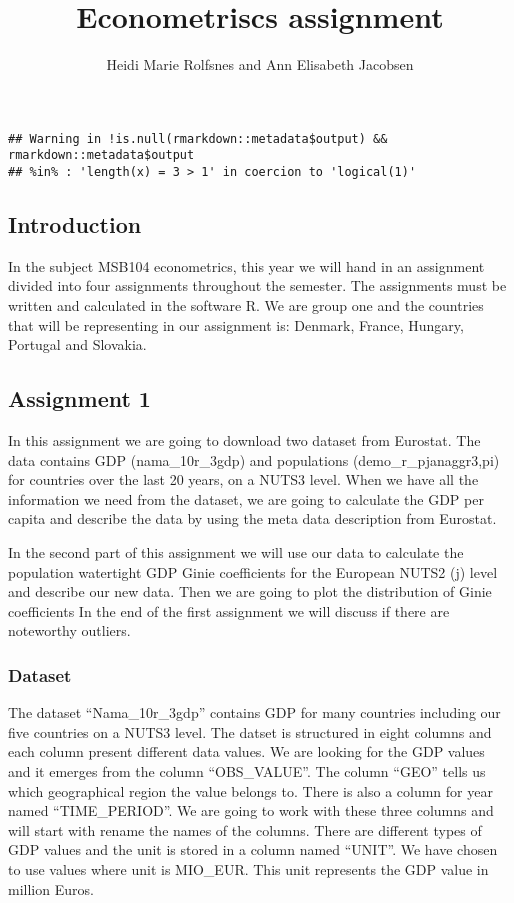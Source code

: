 \documentclass[
]{article}
\title{Econometriscs assignment}
\author{Heidi Marie Rolfsnes and Ann Elisabeth Jacobsen}
\date{}
\begin{document}
\maketitle

\begin{verbatim}
## Warning in !is.null(rmarkdown::metadata$output) && rmarkdown::metadata$output
## %in% : 'length(x) = 3 > 1' in coercion to 'logical(1)'
\end{verbatim}

\hypertarget{introduction}{%
\subsection{Introduction}\label{introduction}}

In the subject MSB104 econometrics, this year we will hand in an
assignment divided into four assignments throughout the semester. The
assignments must be written and calculated in the software R. We are
group one and the countries that will be representing in our assignment
is: Denmark, France, Hungary, Portugal and Slovakia.

\hypertarget{assignment-1}{%
\subsection{Assignment 1}\label{assignment-1}}

In this assignment we are going to download two dataset from Eurostat.
The data contains GDP (nama\_10r\_3gdp) and populations
(demo\_r\_pjanaggr3,pi) for countries over the last 20 years, on a NUTS3
level. When we have all the information we need from the dataset, we are
going to calculate the GDP per capita and describe the data by using the
meta data description from Eurostat.

In the second part of this assignment we will use our data to calculate
the population watertight GDP Ginie coefficients for the European NUTS2
(j) level and describe our new data. Then we are going to plot the
distribution of Ginie coefficients In the end of the first assignment we
will discuss if there are noteworthy outliers.

\hypertarget{dataset}{%
\subsubsection{Dataset}\label{dataset}}

The dataset ``Nama\_10r\_3gdp'' contains GDP for many countries
including our five countries on a NUTS3 level. The datset is structured
in eight columns and each column present different data values. We are
looking for the GDP values and it emerges from the column
``OBS\_VALUE''. The column ``GEO'' tells us which geographical region
the value belongs to. There is also a column for year named
``TIME\_PERIOD''. We are going to work with these three columns and will
start with rename the names of the columns. There are different types of
GDP values and the unit is stored in a column named ``UNIT''. We have
chosen to use values where unit is MIO\_EUR. This unit represents the
GDP value in million Euros.
\end{document}
